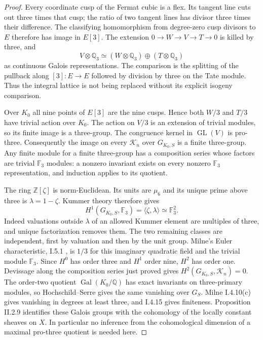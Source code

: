 \begin{proof}
Every coordinate cusp of the Fermat cubic is a flex. Its tangent line
cuts out three times that cusp; the ratio of two tangent lines has
divisor three times their difference. The classifying homomorphism
from degree-zero cusp divisors to $E$ therefore has image in $E[3]$.
The extension $0\to W\to V\to T\to0$ is killed by three, and
\[
 V\otimes\mathbb Q_3\simeq
 (W\otimes\mathbb Q_3)\oplus(T\otimes\mathbb Q_3)
 \tag{A.1.4}
\]
as continuous Galois representations. The comparison is the splitting
of the pullback along $[3]:E\to E$ followed by division by three on
the Tate module. Thus the integral lattice is not being replaced
without its explicit isogeny comparison.

Over $K_0$ all nine points of $E[3]$ are the nine cusps. Hence both
$W/3$ and $T/3$ have trivial action over $K_0$. The action on $V/3$
is an extension of trivial modules, so its finite image is a
three-group. The congruence kernel in $\operatorname{GL}(V)$ is
pro-three. Consequently the image on every $\mathcal K_n$ over
$G_{K_0,S}$ is a finite three-group. Any finite module for a finite
three-group has a composition series whose factors are trivial
$\mathbb F_3$ modules: a nonzero invariant exists on every nonzero
$\mathbb F_3$ representation, and induction applies to its quotient.

The ring $\mathbb Z[\zeta]$ is norm-Euclidean. Its units are $\mu_6$
and its unique prime above three is $\lambda=1-\zeta$. Kummer theory
therefore gives
\[
 H^1(G_{K_0,S},\mathbb F_3)
  =\langle\zeta,\lambda\rangle\simeq\mathbb F_3^2.
\]
Indeed valuations outside $\lambda$ of an allowed Kummer element are
multiples of three, and unique factorization removes them. The two
remaining classes are independent, first by valuation and then by
the unit group. Milne's Euler characteristic, I.5.1 \cite{MilneADT}, is $1/3$ for
this imaginary quadratic field and the trivial module $\mathbb F_3$.
Since $H^0$ has order three and $H^1$ order nine, $H^2$ has order one.
Devissage along the composition series just proved gives
$H^2(G_{K_0,S},\mathcal K_n)=0$. The order-two quotient
$\operatorname{Gal}(K_0/\mathbb Q)$ has exact invariants on
three-primary modules, so Hochschild--Serre gives the same vanishing
over $G_S$. Milne I.4.10(c) gives vanishing in degrees at least three,
and I.4.15 gives finiteness. Proposition II.2.9 identifies these
Galois groups with the cohomology of the locally constant sheaves
on $X$. In particular no inference from the cohomological dimension
of a maximal pro-three quotient is needed here.


\end{proof}
